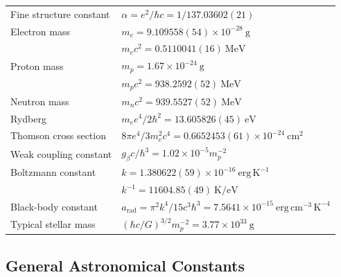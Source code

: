 \endgroup

\clearpage
\begingroup
\footnotesize
\renewcommand{\arraystretch}{1.16}
\begin{center}
\begin{tabular}{@{}p{}p{}@{}}
Fine structure constant &
  \(\alpha=e^2/\hbar c=1/137.03602(21)\)\\
Electron mass &
  \(m_e=9.109558(54)\times10^{-28}\ \mathrm{g}\)\\
&
  \(m_ec^2=0.5110041(16)\ \mathrm{MeV}\)\\
Proton mass &
  \(m_p=1.67\times10^{-24}\ \mathrm{g}\)\\
&
  \(m_pc^2=938.2592(52)\ \mathrm{MeV}\)\\
Neutron mass &
  \(m_nc^2=939.5527(52)\ \mathrm{MeV}\)\\
Rydberg &
  \(m_ee^4/2\hbar^2=13.605826(45)\ \mathrm{eV}\)\\
Thomson cross section &
  \(8\pi e^4/3m_e^2c^4=0.6652453(61)\times10^{-24}\ \mathrm{cm^2}\)\\
Weak coupling constant &
  \(g_\beta c/\hbar^3=1.02\times10^{-5}m_p^{-2}\)\\
Boltzmann constant &
  \(k=1.380622(59)\times10^{-16}\ \mathrm{erg\,K^{-1}}\)\\
&
  \(k^{-1}=11604.85(49)\ \mathrm{K/eV}\)\\
Black-body constant &
  \(a_{\mathrm{rad}}=\pi^2k^4/15c^3\hbar^3
    =7.5641\times10^{-15}\ \mathrm{erg\,cm^{-3}\,K^{-4}}\)\\
Typical stellar mass &
  \((\hbar c/G)^{3/2}m_p^{-2}=3.77\times10^{33}\ \mathrm{g}\)
\end{tabular}
\end{center}

\subsection*{General Astronomical Constants}

